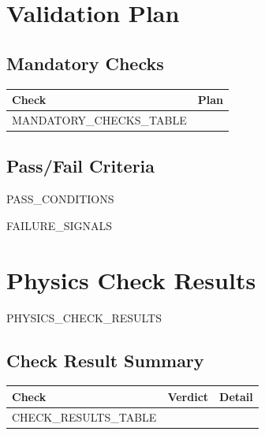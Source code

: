 \documentclass[11pt,a4paper]{article}
\begin{document}

\section{Validation Plan}

\subsection{Mandatory Checks}

\begin{longtable}{>{\raggedright}p{4cm} p{8cm}}
\toprule
\textbf{Check} & \textbf{Plan} \\
\midrule
\endhead
{{MANDATORY_CHECKS_TABLE}}
\bottomrule
\end{longtable}

\subsection{Pass/Fail Criteria}

\begin{infobox}
{{PASS_CONDITIONS}}
\end{infobox}

\begin{failbox}
{{FAILURE_SIGNALS}}
\end{failbox}


\section{Physics Check Results}

{{PHYSICS_CHECK_RESULTS}}

\subsection{Check Result Summary}

\begin{longtable}{>{\raggedright}p{4cm} p{2.5cm} p{6cm}}
\toprule
\textbf{Check} & \textbf{Verdict} & \textbf{Detail} \\
\midrule
\endhead
{{CHECK_RESULTS_TABLE}}
\bottomrule
\end{longtable}
\end{document}
